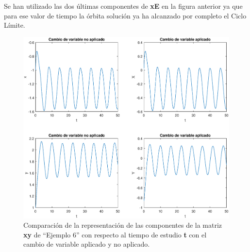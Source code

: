 \documentclass[12pt,a4paper]{report} %
\begin{document}
    \vspace{0.5cm}\noindent Se han utilizado las dos últimas componentes de \textbf{xE} en la figura anterior ya que para ese valor de tiempo la órbita solución ya ha alcanzado por completo el Ciclo Límite.
    
    \newpage
    
    \begin{figure}[h]
    	\centering
    	\includegraphics[width=1.2\textwidth,center]{g2ejem6.eps}
    	\caption{Comparación de la representación de las componentes de la matriz \textbf{xy} de ``Ejemplo 6'' con respecto al tiempo de estudio \textbf{t} con el cambio de variable aplicado y no aplicado.}
    	\label{fig:g2ejem6}
    \end{figure}\smallskip
	
	\newpage
	
\end{document}
